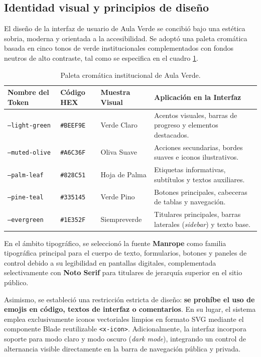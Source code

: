 \subsection{Identidad visual y principios de diseño}
\label{sec:identidad_visual}

El diseño de la interfaz de usuario de Aula Verde se concibió bajo una estética sobria, moderna y orientada a la accesibilidad. Se adoptó una paleta cromática basada en cinco tonos de verde institucionales complementados con fondos neutros de alto contraste, tal como se especifica en el cuadro \ref{tabla:paleta_colores}.

\begin{table}[htbp]
\centering
\caption{Paleta cromática institucional de Aula Verde.}
\label{tabla:paleta_colores}
\small
\begin{tabularx}{\textwidth}{|p{3.2cm}|p{2.2cm}|p{2.8cm}|X|}
\hline
\rowcolor[gray]{0.9}
\textbf{Nombre del Token} & \textbf{Código HEX} & \textbf{Muestra Visual} & \textbf{Aplicación en la Interfaz} \\
\hline
\texttt{--light-green} & \texttt{\#BEEF9E} & Verde Claro & Acentos visuales, barras de progreso y elementos destacados. \\
\hline
\texttt{--muted-olive} & \texttt{\#A6C36F} & Oliva Suave & Acciones secundarias, bordes suaves e iconos ilustrativos. \\
\hline
\texttt{--palm-leaf} & \texttt{\#828C51} & Hoja de Palma & Etiquetas informativas, subtítulos y textos auxiliares. \\
\hline
\texttt{--pine-teal} & \texttt{\#335145} & Verde Pino & Botones principales, cabeceras de tablas y navegación. \\
\hline
\texttt{--evergreen} & \texttt{\#1E352F} & Siempreverde & Titulares principales, barras laterales (\textit{sidebar}) y texto base. \\
\hline
\end{tabularx}
\end{table}

En el ámbito tipográfico, se seleccionó la fuente \textbf{Manrope} como familia tipográfica principal para el cuerpo de texto, formularios, botones y paneles de control debido a su legibilidad en pantallas digitales, complementada selectivamente con \textbf{Noto Serif} para titulares de jerarquía superior en el sitio público.

Asimismo, se estableció una restricción estricta de diseño: \textbf{se prohíbe el uso de emojis en código, textos de interfaz o comentarios}. En su lugar, el sistema emplea exclusivamente iconos vectoriales limpios en formato SVG mediante el componente Blade reutilizable \texttt{<x-icon>}. Adicionalmente, la interfaz incorpora soporte para modo claro y modo oscuro (\textit{dark mode}), integrando un control de alternancia visible directamente en la barra de navegación pública y privada.

